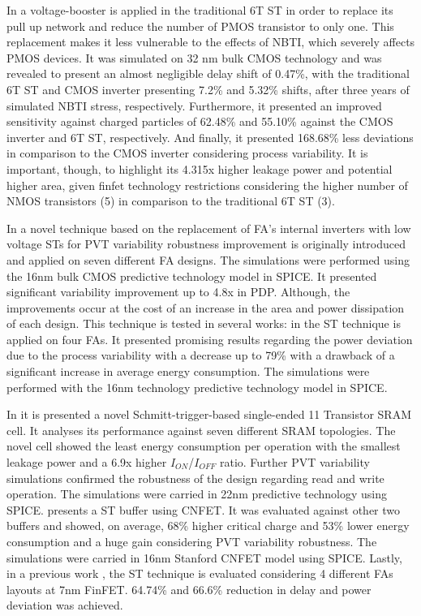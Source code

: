 \documentclass[pgmicro,mestrado,english]{iiufrgs}
\begin{document}
In \cite{shah2020soft} a voltage-booster is applied in the traditional 6T ST in order to replace its pull up network and reduce the number of PMOS transistor to only one. This replacement makes it less vulnerable to the effects of NBTI, which severely affects PMOS devices. It was simulated on 32 nm bulk CMOS technology and was revealed to present an almost negligible delay shift of 0.47\%, with the traditional 6T ST and CMOS inverter presenting 7.2\% and 5.32\% shifts, after three years of simulated NBTI stress, respectively. Furthermore, it presented an improved sensitivity against charged particles of 62.48\% and 55.10\% against the CMOS inverter and 6T ST, respectively. And finally, it presented 168.68\% less deviations in comparison to the CMOS inverter considering process variability. It is important, though, to highlight its 4.315x higher leakage power and potential higher area, given finfet technology restrictions considering the higher number of NMOS transistors (5) in comparison to the traditional 6T ST (3).

In \cite{dokania2015circuit} a novel technique based on the replacement of FA’s internal inverters with low voltage STs for PVT variability robustness improvement is originally introduced and applied on seven different FA designs. The simulations were performed using the 16nm bulk CMOS predictive technology model in SPICE. It presented significant variability improvement up to 4.8x in PDP. Although, the improvements occur at the cost of an increase in the area and power dissipation of each design. This technique is tested in several works: in \cite{samuel2016} the ST technique is applied on four FAs. It presented promising results regarding the power deviation due to the process variability with a decrease up to 79\% with a drawback of a significant increase in average energy consumption. The simulations were performed with the 16nm technology predictive technology model in SPICE.

 In \cite{ahmad2016single} it is presented a novel Schmitt-trigger-based single-ended 11 Transistor SRAM cell. It analyses its performance against seven different SRAM topologies. The novel cell showed the least energy consumption per operation with the smallest leakage power and a 6.9x higher $I_{ON}$/$I_{OFF}$ ratio. Further PVT variability simulations confirmed the robustness of the design regarding read and write operation. The simulations were carried in 22nm predictive technology using SPICE. \cite{moghaddam2017design} presents a ST buffer using CNFET. It was evaluated against other two buffers and showed, on average, 68\% higher critical charge and 53\% lower energy consumption and a huge gain considering PVT variability robustness. The simulations were carried in 16nm Stanford CNFET model using SPICE. Lastly, in a previous work \cite{moraes2018evaluation}, the ST technique is evaluated considering 4 different FAs layouts at 7nm FinFET. 64.74\% and 66.6\% reduction in delay and power deviation was achieved.
\end{document}
